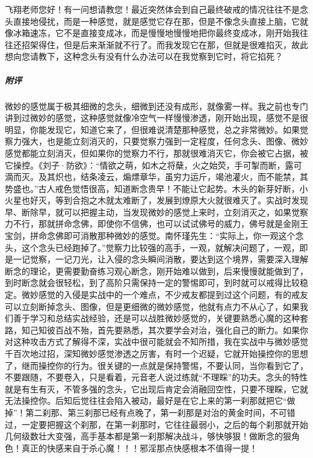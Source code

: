 \begin{case}
    飞翔老师您好！有一问想请教您！最近突然体会到自己最终破戒的情况往往不是念头直接地侵扰，而是一种感觉，就是感觉它存在那，但是不像念头直接上脑，它就像冰箱速冻，它不是直接变成冰，而是慢慢地慢慢地把你最终变成冰，刚开始我往往还招架得住，但是后来渐渐就不行了。而我发现它在那，但就是很难掐灭，故此想向您请教下，这种念头有没有什么办法可以在我觉察到它时，将它掐死？
    \subparagraph{附评} 微妙的感觉属于极其细微的念头，细微到还没有成形，就像雾一样。我之前也专门讲到过微妙的感觉，这种感觉就像冷空气一样慢慢渗透，刚开始出现，感觉不是很明显，你能发现它，知道它来了，但很难说清楚那种感觉，总之非常微妙。如果觉察力强大，也是能立刻消灭的，只要觉察力强到一定程度，任何念头、图像、微妙感觉都能立刻消灭，但如果你的觉察力不行，那就很难消灭它，你会被它占据，被它操控。《刘子·防欲》：“情欲之萌，如木之将蘖，火之始荧，手可掣而断，露可滴而灭。及其炽也，结条凌云，煽熛章华，虽穷力运斤，竭池灌火，而不能禁，其势盛也。”古人戒色觉悟很高，知道断念贵早！不能让它起势。木头的新芽好断，小火星也好灭，等到合抱之木就太难断了，发展到燎原大火就很难灭了。实战时发现早、断除早，就可以把握主动，当发现微妙的感觉上来时，立刻消灭之，如果觉察力不行，那就拼命念佛，即使你不信佛，也可以试试佛号的威力，佛号就是金刚王宝剑，拼命念佛即可消散那种微妙的感觉。南怀瑾先生：“实际上，你一观这个念头，这个念头已经跑掉了。”觉察力比较强的高手，一观，就解决问题了，一观，即是一记觉察，一记刀光，让入侵的念头瞬间消散，要达到这个境界，需要深入理解断念的理论，更需要勤奋练习观心断念，刚开始难以做到，后来慢慢就能做到了，到时断念就会很轻松，到了高阶只需保持一定的警惕即可，到时就可以戒得比较稳定。微妙感觉的入侵是实战中的一个难点，不少戒友都提到过这个问题，有的戒友可以立刻断掉念头、图像，但是更细微的微妙感觉，他就有点力不从心了，如果我们善于学习和总结实战经验，还是可以战胜微妙感觉的，关键要熟悉心魔的这种套路，知己知彼百战不殆，首先要熟悉，其次要学会对治，强化自己的断力。如果你对这种攻击方式了解得不深，实战中很可能就会不知所措，我在实战中与微妙感觉千百次地过招，深知微妙感觉渗透之厉害，有时一个迟疑，它就开始操控你的思想了，继而操控你的行为。很关键的一点就是保持警惕，不要认同，当你看到它了，不要跟随，不要卷入，只是看着，元音老人说过练就“不理睬”的功夫。念头的特性就是有生有灭，不管多强的念头，它出现后肯定会消融回空性，只要不理睬，它就无法操控你。后知后觉往往会陷入被动，最好是在它上来的第一刹那就把它“做掉”！第二刹那、第三刹那已经有点晚了，第一刹那是对治的黄金时间，不可错过，一定要把握这个刹那，在第一刹那时，它往往最弱小，之后的每个刹那就开始几何级数壮大变强，高手基本都是第一刹那解决战斗，够快够狠！做断念的狠角色！真正的快感来自于杀心魔！！！邪淫那点快感根本不值得一提！
\end{case}

